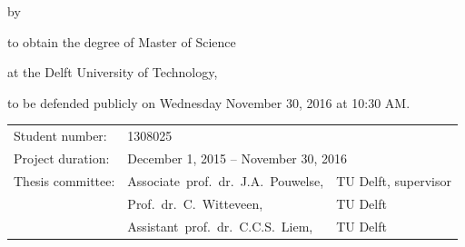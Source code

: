 \begin{titlepage}


\begin{center}


{\makeatletter
\largetitlestyle\fontsize{64}{94}\selectfont\@title
\makeatother}

{\makeatletter
\ifx\@subtitle\undefined\else
    \bigskip
   {\tudsffamily\fontsize{22}{32}\selectfont\@subtitle}    
\fi
\makeatother}

\bigskip
\bigskip

by

\bigskip
\bigskip

{\makeatletter
\largetitlestyle\fontsize{26}{26}\selectfont\@author
\makeatother}

\bigskip
\bigskip

to obtain the degree of Master of Science

at the Delft University of Technology,

to be defended publicly on Wednesday November 30, 2016 at 10:30 AM.

\vfill





\begin{tabular}{lll}
    Student number: & 1308025 \\
    Project duration: & \multicolumn{2}{l}{December 1, 2015 -- November 30, 2016} \\
    Thesis committee: & Associate\ prof.\ dr.\ J.A.\ Pouwelse, & TU Delft, supervisor \\
        & Prof.\ dr.\ C.\ Witteveen, & TU Delft \\
        & Assistant\ prof.\ dr.\ C.C.S.\ Liem, & TU Delft
\end{tabular}


\end{center}
\end{titlepage}
